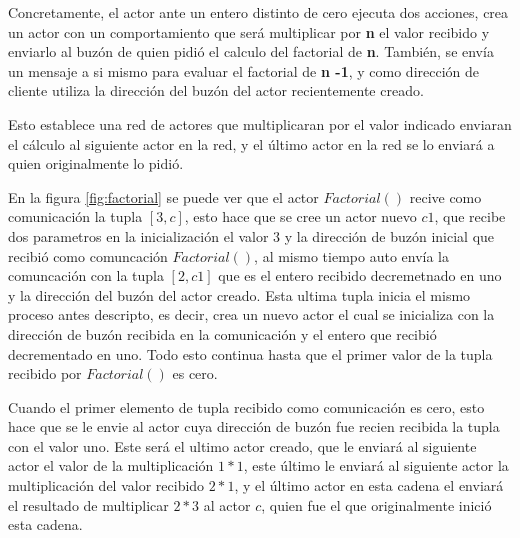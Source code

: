 Concretamente, el actor ante un entero distinto de cero ejecuta dos acciones, crea un actor con
un comportamiento que será multiplicar por \textbf{n} el valor recibido y
enviarlo al buzón de quien pidió el calculo del factorial de \textbf{n}.
También, se envía un mensaje a si mismo para evaluar el factorial de \textbf{n -1}, y como dirección de cliente utiliza la dirección del buzón del actor
recientemente creado. 

Esto establece una red de actores que multiplicaran por  el valor indicado enviaran el cálculo al siguiente actor en la red, y el último actor 
en la red se lo enviará a quien originalmente lo pidió. 

En la figura \ref{fig:factorial} se puede ver que el actor $Factorial()$ recive como comunicación la tupla $[3,c]$, esto hace que se cree un actor nuevo $c1$, que recibe dos parametros en la inicialización el valor $3$ y la dirección de buzón inicial que recibió como comuncación $Factorial()$, al mismo tiempo auto envía la comuncación con la tupla $[2,c1]$ que es el entero recibido decremetnado en uno y la dirección del buzón del actor creado. Esta ultima tupla inicia el mismo proceso antes descripto, es decir, crea un nuevo actor el cual se inicializa con la dirección de buzón recibida en la comunicación y el entero que recibió decrementado en uno. Todo esto continua hasta que el primer valor de la tupla recibido por $Factorial()$ es cero. 

Cuando el primer elemento de tupla recibido como comunicación es cero, esto hace que se le envie al actor cuya dirección de buzón fue recien recibida la tupla con el valor uno. Este será el ultimo actor creado, que le enviará al siguiente actor el valor de la multiplicación $1*1$, este último le enviará al siguiente actor la multiplicación del valor recibido $2*1$, y el último actor en esta cadena el enviará el resultado de multiplicar $2*3$ al actor $c$, quien fue el que originalmente inició esta cadena.

